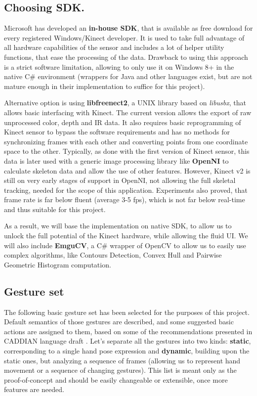 \documentclass[a4paper,11pt,oneside]{article}
\begin{document}
\subsection{Choosing SDK.}

Microsoft has developed an \textbf{in-house SDK}, that is available as free download for every registered Windows/Kinect developer. It is used to take full advantage of all hardware capabilities of the sensor and includes a lot of helper utility functions, that ease the processing of the data. Drawback to using this approach is a strict software limitation, allowing to only use it on Windows 8+ in the native C\# environment (wrappers for Java and other languages exist, but are not mature enough in their implementation to suffice for this project).

Alternative option is using \textbf{libfreenect2}, a UNIX library based on \textit{libusbx}, that allows basic interfacing with Kinect. The current version allows the export of raw unprocessed color, depth and IR data. It also requires basic reprogramming of Kinect sensor to bypass the software requirements and has no methods for synchronizing frames with each other and converting points from one coordinate space to the other. Typically, as done with the first version of Kinect sensor, this data is later used with a generic image processing library like \textbf{OpenNI} to calculate skeleton data and allow the use of other features. However, Kinect v2 is still on very early stages of support in OpenNI, not allowing the full skeletal tracking, needed for the scope of this application. Experiments also proved, that frame rate is far below fluent (average 3-5 fps), which is not far below real-time and thus suitable for this project.

As a result, we will base the implementation on native SDK, to allow us to unlock the full potential of the Kinect hardware, while allowing the fluid UI. We will also include \textbf{EmguCV}, a C\# wrapper of OpenCV to allow us to easily use complex algorithms, like Contours Detection, Convex Hull and Pairwise Geometric Histogram computation.

\subsection{Gesture set}

The following basic gesture set has been selected for the purposes of this project. Default semantics of those gestures are described, and some suggested basic actions are assigned to them, based on some of the recommendations presented in CADDIAN language draft \cite{AB01}. Let's separate all the gestures into two kinds: \textbf{static}, corresponding to a single hand pose expression and \textbf{dynamic},  building upon the static ones, but analyzing a sequence of frames (allowing us to represent hand movement or a sequence of changing gestures). This list is meant only as the proof-of-concept and should be easily changeable or extensible, once more features are needed.
  
\end{document}
